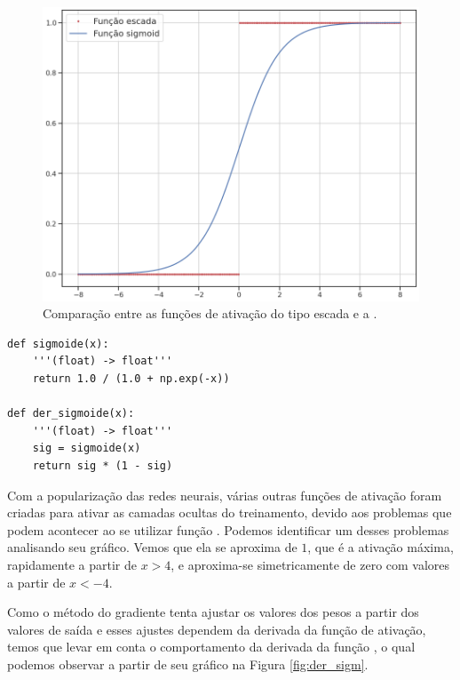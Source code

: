 \begin{figure}[htb]
\centering
\includegraphics[width=12cm]{figuras/ativacao}
\caption{Comparação entre as funções de ativação do tipo escada e a .}
\label{fig:ativacao}
\end{figure}


\estiloR
\begin{lstlisting}[caption={Trecho do script util.py}, label={lst:ativacao}, escapeinside={\%}]
def sigmoide(x):
    '''(float) -> float'''
    return 1.0 / (1.0 + np.exp(-x))

def der_sigmoide(x):
    '''(float) -> float'''
    sig = sigmoide(x)
    return sig * (1 - sig)
\end{lstlisting}


Com a popularização das redes neurais, várias outras funções de ativação foram criadas para ativar as camadas ocultas do treinamento, devido aos problemas que podem acontecer ao se utilizar função . Podemos identificar um desses problemas analisando seu gráfico. Vemos que ela se aproxima de $1$, que é a ativação máxima, rapidamente a partir de $x > 4$, e aproxima-se simetricamente de zero com valores a partir de $x < -4$. 

Como o método do gradiente tenta ajustar os valores dos pesos a partir dos valores de saída e esses ajustes dependem da derivada da função de ativação, temos que levar em conta o comportamento da derivada da função , o qual podemos observar a partir de seu gráfico na Figura \ref{fig:der_sigm}.

